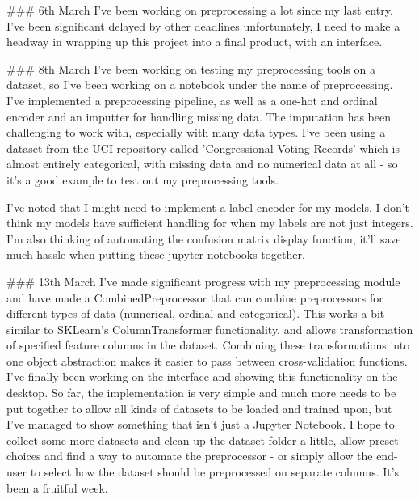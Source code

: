 \documentclass[letterpaper,10pt]{article}
\begin{document}
\begin{markdown}
### 6th March
I've been working on preprocessing a lot since my last entry. I've been significant delayed by other deadlines unfortunately, I need to make a headway in wrapping up this project into a final product, with an interface. 

### 8th March
I've been working on testing my preprocessing tools on a dataset, so I've been working on a notebook under the name of preprocessing. I've implemented a preprocessing pipeline, as well as a one-hot and ordinal encoder and an imputter for handling missing data. The imputation has been challenging to work with, especially with many data types. I've been using a dataset from the UCI repository called 'Congressional Voting Records' which is almost entirely categorical, with missing data and no numerical data at all - so it's a good example to test out my preprocessing tools.

I've noted that I might need to implement a label encoder for my models, I don't think my models have sufficient handling for when my labels are not just integers. I'm also thinking of automating the confusion matrix display function, it'll save much hassle when putting these jupyter notebooks together.

### 13th March
I've made significant progress with my preprocessing module and have made a CombinedPreprocessor that can combine preprocessors for different types of data (numerical, ordinal and categorical). This works a bit similar to SKLearn's ColumnTransformer functionality, and allows transformation of specified feature columns in the dataset. Combining these transformations into one object abstraction makes it easier to pass between cross-validation functions.  
I've finally been working on the interface and showing this functionality on the desktop. So far, the implementation is very simple and much more needs to be put together to allow all kinds of datasets to be loaded and trained upon, but I've managed to show something that isn't just a Jupyter Notebook. I hope to collect some more datasets and clean up the dataset folder a little, allow preset choices and find a way to automate the preprocessor - or simply allow the end-user to select how the dataset should be preprocessed on separate columns. It's been a fruitful week.  


\end{markdown}
\end{document}
